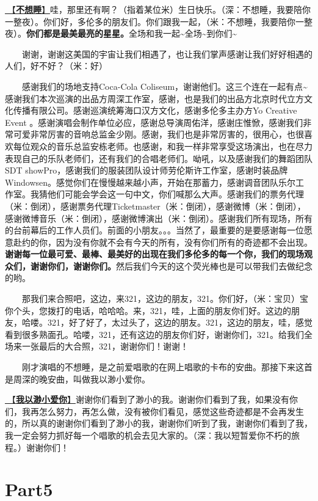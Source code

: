 \documentclass[]{ctexbook}
\begin{document}
\hyperref[donot-want-to-sleep]{🎵【\textbf{不想睡}】}哇，那里还有啊？（指着某位米）生日快乐。（深：不想睡，我要陪你一整夜）。你们好，多伦多的朋友们。你们跟我一起，（米：不想睡，我要陪你一整夜）。\textbf{你们都是最美最亮的星星。}全场和我一起\textasciitilde 全场\textasciitilde 到你们\textasciitilde{}

  谢谢，谢谢这美国的宇宙让我们相遇了，也让我们掌声感谢让我们好好相遇的人们，好不好？（米：好）

  感谢我们的场地支持Coca-Cola Coliseum，谢谢他们。这三个连在一起有点\textasciitilde 感谢我们本次巡演的出品方周深工作室，感谢，也是我们的出品方北京时代立方文化传播有限公司。感谢巡演统筹海口汉方文化，感谢多伦多主办方Yo Creative Event 。感谢演唱会制作单位必应，感谢总导演周佑洋，感谢庄惟惞，感谢我们非常可爱非常厉害的音响总监金少刚。感谢，我们也是非常厉害的，很用心，也很喜欢每位观众的音乐总监安栋老师。也感谢，和我一样非常享受这场演出，也在尽力表现自己的乐队老师们，还有我们的合唱老师们。呦吼，以及感谢我们的舞蹈团队SDT showPro，感谢我们的服装团队设计师劳伦斯许工作室，感谢时装品牌Windowsen。感觉你们在慢慢越来越小声，开始在那蓄力，感谢调音团队乐尔工作室。我猜他们可能会学会这一句中文，你们喊那么大声。感谢我们的票务代理（米：倒闭），感谢票务代理Ticketmaster（米：倒闭），感谢微博（米：倒闭），感谢微博音乐（米：倒闭），感谢微博演出（米：倒闭）。感谢我们所有现场，所有的台前幕后的工作人员们。前面的小朋友。。。当然了，最重要的是要感谢每一位愿意赴约的你，因为没有你就不会有今天的所有，没有你们所有的奇迹都不会出现。\textbf{谢谢每一位最可爱、最棒、最美好的出现在我们多伦多的每一个你，我们的现场观众们，谢谢你们，谢谢你们。}然后我们今天的这个荧光棒也是可以带我们去做纪念的哟。

  那我们来合照吧，这边，来321，这边的朋友，321。你们好，（米：宝贝）宝你个头，您拨打的电话，哈哈哈。来，321，哇，上面的朋友你们好。这边的朋友，哈喽。321，好了好了，太过头了，这边的朋友。321，这边的朋友，哇，感觉看到很多熟面孔。哈喽，321，还有这边的朋友你们好，谢谢你们，321。给我们全场来一张最后的大合照，321，谢谢你们！谢谢！

  刚才演唱的不想睡，是之前爱唱歌的在网上唱歌的卡布的安曲。那接下来这首是周深的晚安曲，叫做我以渺小爱你。

\hyperref[loving-you-in-my-humble-way]{🎵【\textbf{我以渺小爱你}】}谢谢你们看到了渺小的我。谢谢你们看到了我，如果没有你们，我再怎么努力，再怎么做，没有被你们看见，感觉这些奇迹都是不会再发生的，所以真的谢谢你们看到了渺小的我，谢谢你们听到了我，谢谢你们看到了我，我一定会努力抓好每一个唱歌的机会去见大家的。（深：我以短暂爱你不朽的旅程。）谢谢你们！

\section{Part5}\label{Toronto-20250314-part5}
\end{document}
